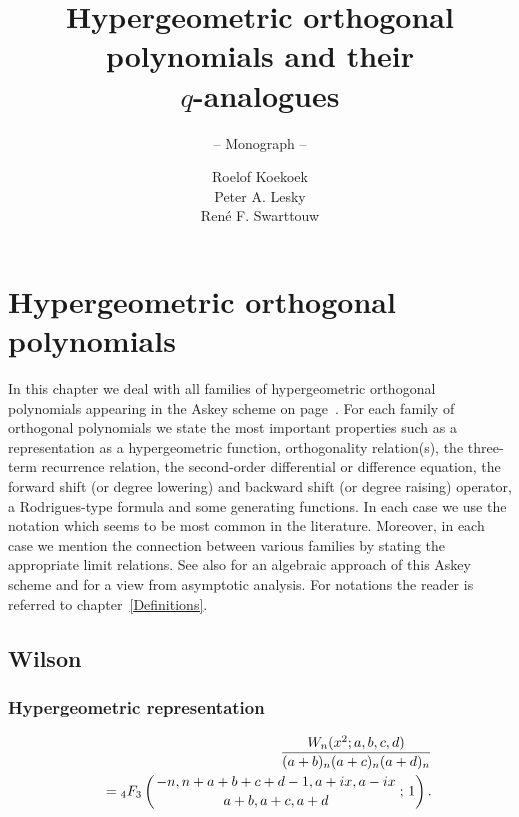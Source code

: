 \documentclass[envcountchap,graybox]{svmono}
\newcounter{rom}
\newcommand{\hyp}[5]{\mbox{}_{#1}{F}_{#2}
\left(\genfrac{}{}{0pt}{}{#3}{#4}\,;\,#5\right)}
\newcommand{\hyp}[5]{\,\mbox{}_{#1}F_{#2}\!\left(
  \genfrac{}{}{0pt}{}{#3}{#4};#5\right)}
\begin{document}
\author{Roelof Koekoek\\[2.5mm]Peter A. Lesky\\[2.5mm]Ren\'e F. Swarttouw}
\title{Hypergeometric orthogonal polynomials and their\\$q$-analogues}
\subtitle{-- Monograph --}
\maketitle

\frontmatter

\large

\addtocounter{chapter}{8}
\chapter{Hypergeometric orthogonal polynomials}
\label{HyperOrtPol}


In this chapter we deal with all families of hypergeometric orthogonal polynomials
appearing in the Askey scheme on page~\pageref{scheme}. For each family of orthogonal
polynomials we state the most important properties such as a representation as a
hypergeometric function, orthogonality relation(s), the three-term recurrence relation,
the second-order differential or difference equation, the forward shift (or degree lowering)
and backward shift (or degree raising) operator, a Rodrigues-type formula and some generating
functions. In each case we use the notation which seems to be most common in the literature.
Moreover, in each case we mention the connection between various families by stating the
appropriate limit relations. See also \cite{Terwilliger2006} for an algebraic approach of
this Askey scheme and \cite{TemmeLopez2001} for a view from asymptotic analysis.
For notations the reader is referred to chapter~\ref{Definitions}.

\section{Wilson}

\par

\subsection*{Hypergeometric representation}
\begin{eqnarray}
\label{DefWilson}
& &\frac{W_n(x^2;a,b,c,d)}{(a+b)_n(a+c)_n(a+d)_n}\nonumber\\
& &{}=\hyp{4}{3}{-n,n+a+b+c+d-1,a+ix,a-ix}{a+b,a+c,a+d}{1}.
\end{eqnarray}
\end{document}
